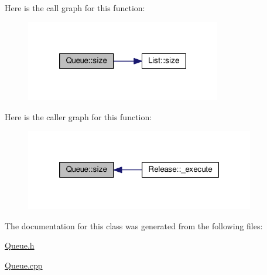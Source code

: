 Here is the call graph for this function\-:\nopagebreak
\begin{figure}[H]
\begin{center}
\leavevmode
\includegraphics[width=242pt]{class_queue_a4cd92f99b7abc9ec4df32690dc5a037d_cgraph}
\end{center}
\end{figure}




Here is the caller graph for this function\-:\nopagebreak
\begin{figure}[H]
\begin{center}
\leavevmode
\includegraphics[width=284pt]{class_queue_a4cd92f99b7abc9ec4df32690dc5a037d_icgraph}
\end{center}
\end{figure}




The documentation for this class was generated from the following files\-:\begin{DoxyCompactItemize}
\item 
\hyperlink{_queue_8h}{Queue.\-h}\item 
\hyperlink{_queue_8cpp}{Queue.\-cpp}\end{DoxyCompactItemize}
